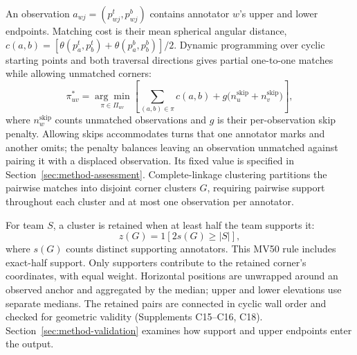

An observation $a_{wj}=(p^t_{wj},p^b_{wj})$ contains annotator $w$'s upper and lower endpoints. Matching cost is their mean spherical angular distance, $c(a,b)=[\theta(p_a^t,p_b^t)+\theta(p_a^b,p_b^b)]/2$. Dynamic programming over cyclic starting points and both traversal directions gives partial one-to-one matches while allowing unmatched corners:
\begin{equation}
 \pi_{uv}^{*}=\underset{\pi\in\Pi_{uv}}{\arg\min}
 \left[\sum_{(a,b)\in\pi}c(a,b)
 +g\bigl(n_u^{\mathrm{skip}}+n_v^{\mathrm{skip}}\bigr)\right],
 \label{eq:cyclic-match}
\end{equation}
where $n_w^{\mathrm{skip}}$ counts unmatched observations and $g$ is their per-observation skip penalty. Allowing skips accommodates turns that one annotator marks and another omits; the penalty balances leaving an observation unmatched against pairing it with a displaced observation. Its fixed value is specified in Section~\ref{sec:method-assessment}. Complete-linkage clustering partitions the pairwise matches into disjoint corner clusters $G$, requiring pairwise support throughout each cluster and at most one observation per annotator.

For team $S$, a cluster is retained when at least half the team supports it:
\begin{equation}
 z(G)=\mathrm{1}[2s(G)\geq |S|],
 \label{eq:mv50}
\end{equation}
where $s(G)$ counts distinct supporting annotators. This MV50 rule includes exact-half support. Only supporters contribute to the retained corner's coordinates, with equal weight. Horizontal positions are unwrapped around an observed anchor and aggregated by the median; upper and lower elevations use separate medians. The retained pairs are connected in cyclic wall order and checked for geometric validity (Supplements C15--C16, C18). Section~\ref{sec:method-validation} examines how support and upper endpoints enter the output.

